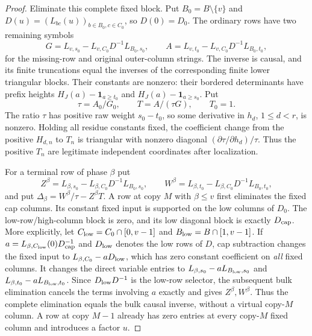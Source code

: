 \documentclass[11pt,a4paper]{amsart}
\numberwithin{equation}{section}
\theoremstyle{plain}
\theoremstyle{definition}
\newcommand{\one}{\mathbf1}
\begin{document}
\begin{proof}
Eliminate this complete fixed block.  Put \(B_0=B\setminus\{v\}\) and
\(D(u)=(L_{bc}(u))_{b\in B_0,c\in C_0}\), so \(D(0)=D_0\).
The ordinary rows have two remaining symbols
\[
 G=L_{v,s_0}-L_{v,C_0}D^{-1}L_{B_0,s_0},\qquad
 A=L_{v,t_0}-L_{v,C_0}D^{-1}L_{B_0,t_0},
\]
for the missing-row and original outer-column strings.
The inverse is causal, and its finite truncations equal the inverses
of the corresponding finite lower triangular blocks.
Their constants are nonzero: their bordered
determinants have prefix heights
\(H_J(a)-\one_{a\ge t_0}\) and
\(H_J(a)-\one_{a\ge s_0}\).  Put
\[
 \tau=A_0/G_0,\qquad T=A/(\tau G),\qquad T_0=1.
\]
The ratio \(\tau\) has positive raw weight \(s_0-t_0\), so some
derivative in \(h_d\), \(1\le d<r\), is nonzero.  Holding all residue
constants fixed, the coefficient change from the positive
\(H_{d,n}\) to \(T_n\) is triangular with nonzero diagonal
\((\partial\tau/\partial h_d)/\tau\).  Thus the positive \(T_n\) are
legitimate independent coordinates after localization.

For a terminal row of phase \(\beta\) put
\[
 Z^\beta=L_{\beta,s_0}-L_{\beta,C_0}D^{-1}L_{B_0,s_0},\qquad
 W^\beta=L_{\beta,t_0}-L_{\beta,C_0}D^{-1}L_{B_0,t_0},
\]
and put
\(\Delta_\beta=W^\beta/\tau-Z^\beta T\).  A row at copy \(M\)
with \(\beta\le v\) first eliminates the fixed cap columns.  Its
constant fixed input is supported on the low columns of \(D_0\).
The low-row/high-column block is zero, and its low diagonal block
is exactly \(D_{\rm cap}\).  More explicitly, let
\(C_{\rm low}=C_0\cap[0,v-1]\) and \(B_{\rm low}=B\cap[1,v-1]\).
If \(a=L_{\beta,C_{\rm low}}(0)D_{\rm cap}^{-1}\)
and \(D_{\rm low}\) denotes the low rows of \(D\), cap subtraction
changes the fixed input to \(L_{\beta,C_0}-aD_{\rm low}\), which
has zero constant coefficient on \emph{all} fixed columns.
It changes the direct variable entries to
\(L_{\beta,s_0}-aL_{B_{\rm low},s_0}\) and
\(L_{\beta,t_0}-aL_{B_{\rm low},t_0}\).
Since \(D_{\rm low}D^{-1}\) is the low-row selector, the subsequent
bulk elimination cancels the terms involving \(a\) exactly and gives
\(Z^\beta,W^\beta\).  Thus the complete elimination equals the bulk
causal inverse, without a virtual copy-\(M\) column.
A row at copy \(M-1\) already has zero entries at every copy-\(M\)
fixed column and introduces a factor \(u\).


\end{proof}
\end{document}
